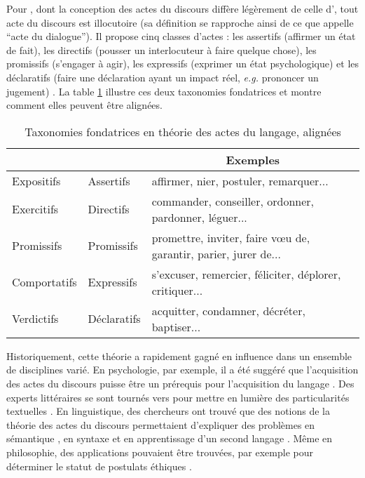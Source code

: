\documentclass[10pt,a4paper,twoside]{article}
\newcommand{\quotes}[1]{``#1''}
\begin{document}
Pour \citet{searle1969speech}, dont la conception des actes du discours diffère légèrement de celle d'\citeauthor{austin1975how}, tout acte du discours est illocutoire (sa définition se rapproche ainsi de ce que \citeauthor{austin1975how} appelle \quotes{acte du dialogue}). Il propose cinq classes d’actes : les assertifs (affirmer un état de fait), les directifs (pousser un interlocuteur à faire quelque chose), les promissifs (s'engager à agir), les expressifs (exprimer un état psychologique) et les déclaratifs (faire une déclaration ayant un impact réel, \textit{e.g.} prononcer un jugement) \cite{searle1976taxonomy}. La table \ref{fig:fundamentalTaxonomies} illustre ces deux taxonomies fondatrices et montre comment elles peuvent être alignées.

\begin{table}
	\centering
	\begin{tabular}{lll}
		\toprule
		\multicolumn{1}{c}{\citet{austin1975how}} & \multicolumn{1}{c}{\citet{searle1976taxonomy}} & \multicolumn{1}{c}{Exemples} \\
		\midrule
		Expositifs & Assertifs & affirmer, nier, postuler, remarquer... \\
		Exercitifs & Directifs & commander, conseiller, ordonner, pardonner, léguer... \\
		Promissifs & Promissifs & promettre, inviter, faire vœu de, garantir, parier, jurer de...  \\
		Comportatifs & Expressifs & s’excuser, remercier, féliciter, déplorer, critiquer... \\
		Verdictifs & Déclaratifs & acquitter, condamner, décréter, baptiser... \\
		\bottomrule
	\end{tabular}
	\caption{Taxonomies fondatrices en théorie des actes du langage, alignées}
	\label{fig:fundamentalTaxonomies}
\end{table}

Historiquement, cette théorie a rapidement gagné en influence dans un ensemble de disciplines varié. En psychologie, par exemple, il a été suggéré que l'acquisition des actes du discours puisse être un prérequis pour l'acquisition du langage \cite{bruner1975communication, bates1977gesture}. Des experts littéraires se sont tournés vers \citeauthor{austin1975how} pour mettre en lumière des particularités textuelles \cite{ohmann1971speech}. En linguistique, des chercheurs ont trouvé que des notions de la théorie des actes du discours permettaient d'expliquer des problèmes en sémantique \cite{fillmore1971some}, en syntaxe \cite{sadock1974toward} et en apprentissage d'un second langage \cite{jakobovits1974context}. Même en philosophie, des applications pouvaient être trouvées, par exemple pour déterminer le statut de postulats éthiques \cite{searle1969speech}.
\end{document}
